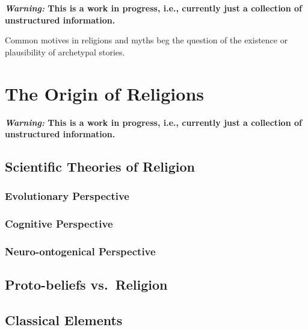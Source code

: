 \documentclass[]{book}
\begin{document}
\textbf{\emph{Warning:} This is a work in progress, i.e., currently just a collection of unstructured information.}

Common motives in religions and myths beg the question of the existence or plausibility of archetypal stories.

\hypertarget{the-origin-of-religions}{%
\chapter{The Origin of Religions}\label{the-origin-of-religions}}

\textbf{\emph{Warning:} This is a work in progress, i.e., currently just a collection of unstructured information.}

\hypertarget{scientific-theories-of-religion}{%
\section{Scientific Theories of Religion}\label{scientific-theories-of-religion}}

\hypertarget{evolutionary-perspective}{%
\subsection{Evolutionary Perspective}\label{evolutionary-perspective}}

\hypertarget{cognitive-perspective}{%
\subsection{Cognitive Perspective}\label{cognitive-perspective}}

\hypertarget{neuro-ontogenical-perspective}{%
\subsection{Neuro-ontogenical Perspective}\label{neuro-ontogenical-perspective}}

\hypertarget{proto-beliefs-vs.-religion}{%
\section{Proto-beliefs vs.~Religion}\label{proto-beliefs-vs.-religion}}

\hypertarget{classical-elements}{%
\section{Classical Elements}\label{classical-elements}}


\end{document}
